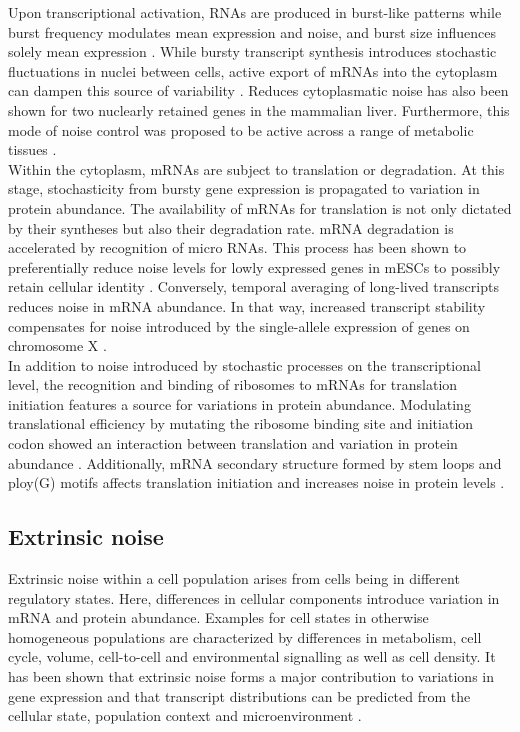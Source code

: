 Upon transcriptional activation, RNAs are produced in burst-like patterns while burst frequency modulates mean expression and noise, and burst size influences solely mean expression \citep{Hornung2012}. While bursty transcript synthesis introduces stochastic fluctuations in nuclei between cells, active export of mRNAs into the cytoplasm can dampen this source of variability \citep{Battich2015a}. Reduces cytoplasmatic noise has also been shown for two nuclearly retained genes in the mammalian liver. Furthermore, this mode of noise control was proposed to be active across a range of metabolic tissues \cite{BaharHalpern2015a}.\\

Within the cytoplasm, mRNAs are subject to translation or degradation. At this stage, stochasticity from bursty gene expression is propagated to variation in protein abundance. The availability of mRNAs for translation is not only dictated by their syntheses but also their degradation rate. mRNA degradation is accelerated by recognition of micro RNAs. This process has been shown to preferentially reduce noise levels for lowly expressed genes in mESCs to possibly retain cellular identity \citep{Schmiedel2015}. Conversely, temporal averaging of long-lived transcripts reduces noise in mRNA abundance. In that way, increased transcript stability compensates for noise introduced by the single-allele expression of genes on chromosome X \citep{Faure2017}.  \\

In addition to noise introduced by stochastic processes on the transcriptional level, the recognition and binding of ribosomes to mRNAs for translation initiation features a source for variations in protein abundance. Modulating translational efficiency by mutating the ribosome binding site and initiation codon showed an interaction between translation and variation in protein abundance \citep{Ozbudak2002}. Additionally, mRNA secondary structure formed by stem loops and ploy(G) motifs affects translation initiation and increases noise in protein levels \citep{Dacheux2017a}.

\subsection{Extrinsic noise}

Extrinsic noise within a cell population arises from cells being in different regulatory states. Here, differences in cellular components introduce variation in mRNA and protein abundance. Examples for cell states in otherwise homogeneous populations are characterized by differences in metabolism, cell cycle, volume, cell-to-cell and environmental signalling as well as cell density. It has been shown that extrinsic noise forms a major contribution to variations in gene expression and that transcript distributions can be predicted from the cellular state, population context and microenvironment \citep{Battich2015a}.

